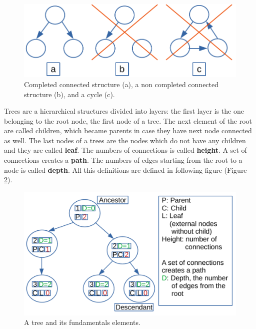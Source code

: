 \begin{figure}[H]
	\begin{center}
		\includegraphics[scale=.6]{chapters/trees/images/trees_2.pdf}
		\caption[Possible structures of a tree.]{Completed connected structure (a), a non completed connected structure (b), and a cycle (c).}
		\label{trees_2}
	\end{center}
\end{figure}

Trees are a hierarchical structures divided into layers: the first layer is the one belonging to the root node, the first node of a tree. The next element of the root are called children, which became parents in case they have next node connected as well. The last nodes of a trees are the nodes which do not have any children and they are called \textbf{leaf}. The numbers of connections is called \textbf{height}. A set of connections creates a \textbf{path}. The numbers of edges starting from the root to a node is called \textbf{depth}.
All this definitions are defined in following figure (Figure \ref{trees_3}).

\begin{figure}[H]
	\begin{center}
		\includegraphics[scale=.6]{chapters/trees/images/trees_3.pdf}
		\caption[A tree and its fundamentals elements.]{A tree and its fundamentals elements.}
		\label{trees_3}
	\end{center}
\end{figure}


